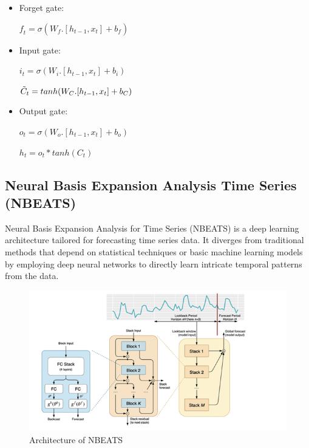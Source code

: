 \documentclass{ieeeojies}
\begin{document}
\begin{itemize}
	\item  Forget gate: 
	\newline \centerline{$\textit{f}_{t} = \sigma (\textit{W}_{\textit{f}}.[h_{t-1},x_{t}] + b_{\textit{f}})$}
	\item Input gate: 
	\newline \centerline{$i_{t} = \sigma(\textit{W}_{i}.[h_{t-1},x_{t}]+b_{i})$}
	\newline \centerline{$\Tilde{C}_{t} = tanh(W_{C}.[h_{t-1},x_{t}] + b_{C})$}
	\item Output gate:
	\newline \centerline{$o_{t} = \sigma(W_{o}.[h_{t-1},x_{t}] + b_{o})$}
	\newline \centerline{$h_{t} = o_{t} * tanh(C_{t})$}
\end{itemize}
\subsection{Neural Basis Expansion Analysis Time Series (NBEATS)}
Neural Basis Expansion Analysis for Time Series (NBEATS) is a deep learning architecture tailored for forecasting time series data. It diverges from traditional methods that depend on statistical techniques or basic machine learning models by employing deep neural networks to directly learn intricate temporal patterns from the data.
\begin{figure}[H]
	\centering
	\begin{minipage}{0.25\textwidth}
		\centering
		\includegraphics[width=1\textwidth]{bibliography/Images/NBEATS_Img1.png}
		\caption{Architecture of NBEATS}
		\label{fig:1}
	\end{minipage}
\end{figure}
\end{document}
